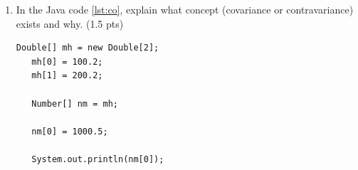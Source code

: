 \documentclass [11pt, a4wide, twoside]{article}
\begin{document}
\begin{enumerate}
\solution{}


\item In the Java code \autoref{lst:co}, explain what concept (covariance or contravariance) exists and why. (1.5 pts)


\begin{lstlisting}[float=h,style=Java,caption={Forms of polymorphism},label=lst:co]
Double[] mh = new Double[2];
   mh[0] = 100.2;
   mh[1] = 200.2;
   
   Number[] nm = mh;
   
   nm[0] = 1000.5;
   
   System.out.println(nm[0]);
\end{lstlisting}


\solution{}

\end{enumerate}
\end{document}
